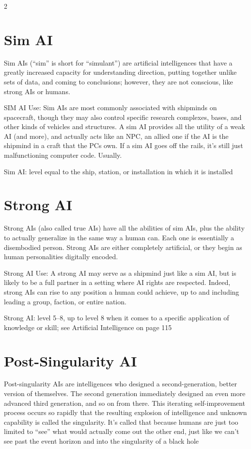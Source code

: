 \begin{multicols}{2}
\section{Sim AI}

Sim AIs (“sim” is short for “simulant”) are artificial intelligences that have a greatly increased capacity for understanding direction, putting together unlike sets of data, and coming to conclusions; however, they are not conscious, like strong AIs or humans.

SIM AI Use: Sim AIs are most commonly associated with shipminds on spacecraft, though they may also control specific research complexes, bases, and other kinds of vehicles and structures. A sim AI provides all the utility of a weak AI (and more), and actually acts like an NPC, an allied one if the AI is the shipmind in a craft that the PCs own. If a sim AI goes off the rails, it’s still just malfunctioning computer code. Usually.

Sim AI: level equal to the ship, station, or installation in which it is installed

\section{Strong AI}

Strong AIs (also called true AIs) have all the abilities of sim AIs, plus the ability to actually generalize in the same way a human can. Each one is essentially a disembodied person. Strong AIs are either completely artificial, or they begin as human personalities digitally encoded.

Strong AI Use: A strong AI may serve as a shipmind just like a sim AI, but is likely to be a full partner in a setting where AI rights are respected. Indeed, strong AIs can rise to any position a human could achieve, up to and including leading a group, faction, or entire nation.

Strong AI: level 5–8, up to level 8 when it comes to a specific application of knowledge or skill; see Artificial Intelligence on page 115

\section{Post-Singularity AI}

Post-singularity AIs are intelligences who designed a second-generation, better version of themselves. The second generation immediately designed an even more advanced third generation, and so on from there. This iterating self-improvement process occurs so rapidly that the resulting explosion of intelligence and unknown capability is called the singularity. It’s called that because humans are just too limited to “see” what would actually come out the other end, just like we can’t see past the event horizon and into the singularity of a black hole


\end{multicols}
